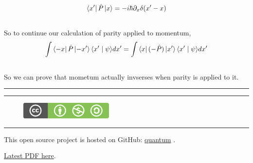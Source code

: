 \documentclass[letterpaper,10pt,english]{sphinxmanual}
\newcommand{\bra}[1]{\left\langle #1\right|}
\newcommand{\ket}[1]{\left| #1\right\rangle}
\newcommand{\braket}[2]{\langle #1 \mid #2 \rangle}
\begin{document}
\begin{enumerate}
\begin{gather}
\begin{split}\bra{x'}\hat P \ket{x} = -i\hbar \partial_x \delta(x'-x)\end{split}\notag\\\begin{split}\end{split}\notag
\end{gather}
So to continue our calculation of parity applied to momentum,
\begin{gather}
\begin{split}\int \bra{-x}\hat P \ket{-x'}\braket{x'}{\psi} d x' = \int \bra{x}(-\hat P)\ket{x'}\braket{x'}{\psi}dx'\end{split}\notag\\\begin{split}\end{split}\notag
\end{gather}
So we can prove that mometum actually invserses when parity is applied to it.

\end{enumerate}


\bigskip\hrule{}\bigskip



\bigskip\hrule{}\bigskip

\begin{figure}[htbp]
\centering
\href{http://creativecommons.org/licenses/by-nc-sa/3.0/us/}{\includegraphics{cc_byncsa.png}}\end{figure}


\bigskip\hrule{}\bigskip


This open source project is hosted on GitHub: \href{https://github.com/emptymalei/quantum}{quantum} .

\href{https://raw.github.com/emptymalei/quantum/master/Notes/\_build/latex/quantum.pdf}{Latest PDF here}.



\renewcommand{\indexname}{Index}
\printindex
\end{document}
